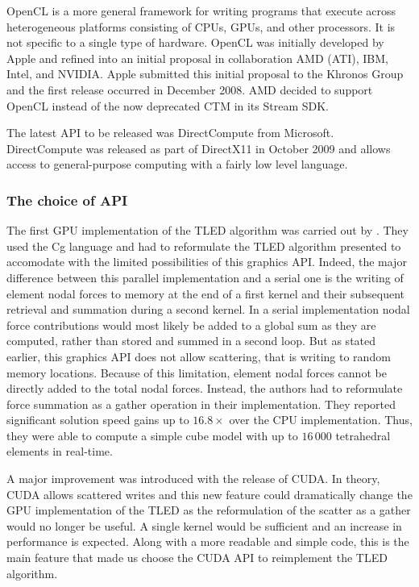 OpenCL is a more general framework for writing programs that execute across heterogeneous platforms consisting of CPUs, GPUs, and other processors. It is not specific to a single type of hardware. OpenCL was initially developed by Apple and refined into an initial proposal in collaboration AMD (ATI), IBM, Intel, and NVIDIA. Apple submitted this initial proposal to the Khronos Group and the first release occurred in December 2008. AMD decided to support OpenCL instead of the now deprecated CTM in its Stream SDK. 

The latest API to be released was DirectCompute from Microsoft. DirectCompute was released as part of DirectX11 in October 2009 and allows access to general-purpose computing with a fairly low level language. 

		
	\subsubsection*{The choice of API}	
The first GPU implementation	of the TLED algorithm was carried out by \cite{Taylor07b,Taylor08}. They used the Cg language and had to reformulate the TLED algorithm presented to accomodate with the limited possibilities of this graphics API. Indeed, the major difference between this parallel implementation and a serial one is the writing of element nodal forces to memory at the end of a first kernel and their subsequent retrieval and summation during a second kernel. In a serial implementation nodal force contributions would most likely be added to a global sum as they are computed, rather than stored and summed in a second loop. But as stated earlier, this graphics API does not allow scattering, that is writing to random memory locations. Because of this limitation, element nodal forces cannot be directly added to the total nodal forces. Instead, the authors had to reformulate force summation as a gather operation in their implementation. They reported significant solution speed gains up to $ 16.8 \times$ over the CPU implementation. Thus, they were able to compute a simple cube model with up to $ 16\,000 $ tetrahedral elements in real-time. 

A major improvement was introduced with the release of CUDA. In theory, CUDA allows scattered writes and this new feature could dramatically change the GPU implementation of the TLED as the reformulation of the scatter as a gather would no longer be useful. A single kernel would be sufficient and an increase in performance is expected. Along with a more readable and simple code, this is the main feature that made us choose the CUDA API to reimplement the TLED algorithm.

